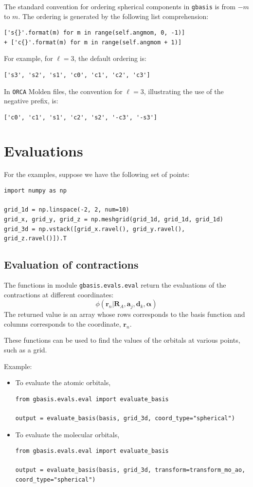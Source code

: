 \documentclass[letterpaper]{article}
\begin{document}
The standard convention for ordering spherical components in \verb|gbasis| is from $-m$ to $m$.
The ordering is generated by the following list comprehension:
\begin{lstlisting}
['s{}'.format(m) for m in range(self.angmom, 0, -1)]
+ ['c{}'.format(m) for m in range(self.angmom + 1)]
\end{lstlisting}
For example, for $\ell = 3$, the default ordering is:
\begin{lstlisting}
['s3', 's2', 's1', 'c0', 'c1', 'c2', 'c3']
\end{lstlisting}
In \verb|ORCA| Molden files, the convention for $\ell = 3$,
illustrating the use of the negative prefix, is:
\begin{lstlisting}
['c0', 'c1', 's1', 'c2', 's2', '-c3', '-s3']
\end{lstlisting}

\section{Evaluations}
For the examples, suppose we have the following set of points:
\begin{lstlisting}
import numpy as np

grid_1d = np.linspace(-2, 2, num=10)
grid_x, grid_y, grid_z = np.meshgrid(grid_1d, grid_1d, grid_1d)
grid_3d = np.vstack([grid_x.ravel(), grid_y.ravel(), grid_z.ravel()]).T
\end{lstlisting}

\subsection{Evaluation of contractions}
The functions in module \verb|gbasis.evals.eval| return the evaluations of the
contractions at different coordinates:
\begin{equation}
  \phi(\mathbf{r}_n | \mathbf{R}_{A}, \mathbf{a}_j, \mathbf{d}_k, \boldsymbol{\alpha})
\end{equation}
The returned value is an array whose rows corresponds to the basis function and
columns corresponds to the coordinate, $\mathbf{r}_n$.

These functions can be used to find the values of the orbitals at various
points, such as a grid.

Example:
\begin{itemize}
\item To evaluate the atomic orbitals,
  \begin{lstlisting}[xleftmargin=-25pt]
from gbasis.evals.eval import evaluate_basis

output = evaluate_basis(basis, grid_3d, coord_type="spherical")
\end{lstlisting}
\item To evaluate the molecular orbitals,
  \begin{lstlisting}[xleftmargin=-25pt]
from gbasis.evals.eval import evaluate_basis

output = evaluate_basis(basis, grid_3d, transform=transform_mo_ao, coord_type="spherical")
\end{lstlisting}
\end{itemize}
\end{document}

